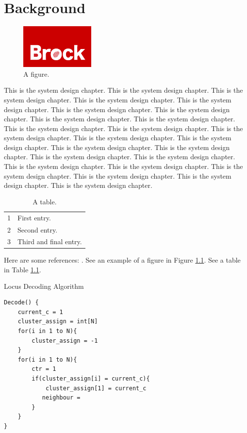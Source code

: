 \chapter{Background}
\label{system}


\begin{figure}[!htb]
\begin{center}
\includegraphics[scale=1.0]{Brock_Logo.png}
\end{center}
\caption{A figure.}
\label{logo}
\end{figure}
This is the system design chapter.
This is the system design chapter.
This is the system design chapter.
This is the system design chapter.
This is the system design chapter.
This is the system design chapter.
This is the system design chapter.
This is the system design chapter.
This is the system design chapter.
This is the system design chapter.
This is the system design chapter.
This is the system design chapter.
This is the system design chapter.
This is the system design chapter.
This is the system design chapter.
This is the system design chapter.
This is the system design chapter.
This is the system design chapter.
This is the system design chapter.
This is the system design chapter.
This is the system design chapter.
This is the system design chapter.
This is the system design chapter.
This is the system design chapter.


\begin{table}[h]
\caption{A table.}
\label{tabledata}
\begin{tabular}{rl}
1 & First entry.\\
2 & Second entry.\\
3 & Third and final entry.
\end{tabular}
\end{table}
Here are some references: \cite{CateniCollaVannucci:, ChiHyuckLeeParkLee:, GoldbergDE:}.
See an example of a figure in Figure \ref{logo}.
See a table in Table \ref{tabledata}.

\begin{table}[b]
\caption{Locus Decoding Algorithm}
\label{algorithmX}
\begin{verbatim}
Decode() {
    current_c = 1
    cluster_assign = int[N]
    for(i in 1 to N){
        cluster_assign = -1
    }
    for(i in 1 to N){
        ctr = 1
        if(cluster_assign[i] = current_c){
            cluster_assign[1] = current_c
           neighbour =
        }
    }
}
\end{verbatim}
\end{table}


